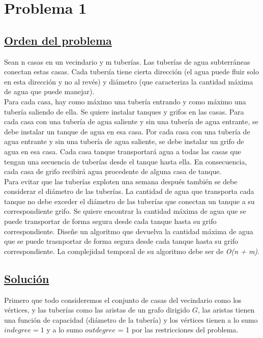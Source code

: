 \documentclass{article}
\begin{document}
    \section{Problema 1}
    
    \subsection{\underline{Orden del problema}} 

    Sean n casas en un vecindario y m tuber\'ias. Las tuber\'ias de agua subterr\'aneas conectan estas casas. Cada
    tuberı\'ia tiene cierta direcci\'on (el agua puede fluir solo en esta direcci\'on y no al rev\'es) y di\'ametro (que caracteriza
    la cantidad m\'axima de agua que puede manejar).
    \\[10pt]
    \noindent Para cada casa, hay como m\'aximo una tuber\'ia entrando y como m\'aximo una tuber\'ia saliendo de ella. Se quiere
    instalar tanques y grifos en las casas. Para cada casa con una tuber\'ia de agua saliente y sin una tuber\'ia de agua
    entrante, se debe instalar un tanque de agua en esa casa. Por cada casa con una tuber\'ia de agua entrante y
    sin una tuber\'ia de agua saliente, se debe instalar un grifo de agua en esa casa. Cada casa tanque transportar\'a
    agua a todas las casas que tengan una secuencia de tuber\'ias desde el tanque hasta ella. En consecuencia, cada
    casa de grifo recibir\'a agua procedente de alguna casa de tanque.
    \\[10pt]
    \noindent Para evitar que las tuber\'ias exploten una semana después tambi\'en se debe considerar el di\'ametro de las tuber\'ias.
    La cantidad de agua que transporta cada tanque no debe exceder el di\'ametro de las tuber\'ias que conectan un
    tanque a su correspondiente grifo. Se quiere encontrar la cantidad m\'axima de agua que se puede transportar de
    forma segura desde cada tanque hasta su grifo correspondiente. Dise\~ne un algoritmo que devuelva la cantidad
    m\'axima de agua que se puede trasnportar de forma segura desde cada tanque hasta su grifo correspondiente.
    La complejidad temporal de su algoritmo debe ser de \textit{O(n + m)}.
    
    \subsection{\underline{Soluci\'on}}

    Primero que todo consideremos el conjunto de casas del vecindario como los v\'ertices, y las tuber\'ias como las aristas de un grafo
    dirigido  $G$, las aristas tienen una funci\'on de capacidad (di\'ametro de la tuber\'ia) y los v\'ertices tienen a lo sumo $indegree = 1$
    y a lo sumo $outdegree$ = 1 por las restricciones del problema.\\\\
\end{document}
